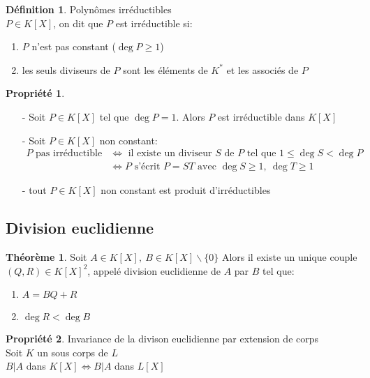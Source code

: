 \documentclass[fleqn]{article}
\theoremstyle{definition} \newtheorem*{defi}{D\'efinition}
\theoremstyle{definition} \newtheorem*{theo}{Th\'eor\`eme}
\theoremstyle{definition} \newtheorem*{coro}{Corollaire}
\theoremstyle{definition} \newtheorem*{nota}{Notation}
\theoremstyle{remark} \newtheorem*{rqs}{Remarques}
\theoremstyle{definition} \newtheorem*{prop}{Propri\'et\'e}
\begin{document}
\begin{defi} Polyn\^omes irr\'eductibles \\
	$P \in K[X]$, on dit que $P$ est irr\'eductible si:
	\begin{enumerate}
		\item $P$ n'est pas constant ($\deg P \geq 1$)
		\item les seuls diviseurs de $P$ sont les \'el\'ements de $K^*$ et les associ\'es de $P$
	\end{enumerate}
\end{defi}

\begin{prop} $ $
	\begin{itemize}
		\item [-] Soit $P \in K[X]$ tel que $\deg P = 1$. Alors $P$ est irr\'eductible dans $K[X]$
		\item [-] Soit $P \in K[X]$ non constant:
			\begin{align*} P \text{ pas irr\'eductible } &\Leftrightarrow \text{ il existe un diviseur } S \text{ de } P \text{ tel que }
			 1 \leq \deg S < \deg P \\
			&\Leftrightarrow P \text{ s'\'ecrit } P = ST \text{ avec } \deg S \geq 1,\ \deg T \geq 1 \end{align*}
		\item [-] tout $P \in K[X]$ non constant est produit d'irr\'eductibles
	\end{itemize}
\end{prop}

\subsection{Division euclidienne}
\begin{theo} Soit $A \in K[X],\ B \in K[X]\backslash \{0\}$
	Alors il existe un unique couple $(Q,R) \in K[X]^2$, appel\'e division euclidienne de $A$ par $B$ tel que:
	\begin{enumerate}
		\item $A = BQ + R$
		\item $\deg R < \deg B$
	\end{enumerate}
\end{theo}

\begin{prop} Invariance de la divison euclidienne par extension de corps \\
	Soit $K$ un sous corps de $L$ \\
	$B | A$ dans $K[X] \Leftrightarrow B | A$ dans $L[X]$
\end{prop}
\end{document}
